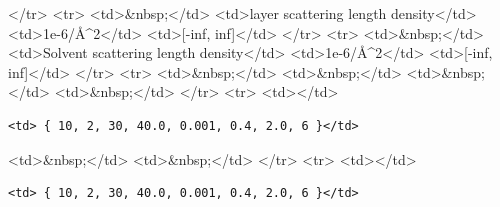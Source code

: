 \textless{}/tr\textgreater{} \textless{}tr\textgreater{} \textless{}td\textgreater{}\&nbsp;\textless{}/td\textgreater{} \textless{}td\textgreater{}layer scattering length density\textless{}/td\textgreater{} \textless{}td\textgreater{}1e-6/\AA{}\textasciicircum{}2\textless{}/td\textgreater{} \textless{}td\textgreater{}[-inf, inf]\textless{}/td\textgreater{} \textless{}/tr\textgreater{} \textless{}tr\textgreater{} \textless{}td\textgreater{}\&nbsp;\textless{}/td\textgreater{} \textless{}td\textgreater{}Solvent scattering length density\textless{}/td\textgreater{} \textless{}td\textgreater{}1e-6/\AA{}\textasciicircum{}2\textless{}/td\textgreater{} \textless{}td\textgreater{}[-inf, inf]\textless{}/td\textgreater{} \textless{}/tr\textgreater{} \textless{}tr\textgreater{} \textless{}td\textgreater{}\&nbsp;\textless{}/td\textgreater{} \textless{}td\textgreater{}\&nbsp;\textless{}/td\textgreater{} \textless{}td\textgreater{}\&nbsp;\textless{}/td\textgreater{} \textless{}td\textgreater{}\&nbsp;\textless{}/td\textgreater{} \textless{}/tr\textgreater{} \textless{}tr\textgreater{} \textless{}td\textgreater{}\textless{}/td\textgreater{}

\begin{verbatim}
<td> { 10, 2, 30, 40.0, 0.001, 0.4, 2.0, 6 }</td>
\end{verbatim}

\textless{}td\textgreater{}\&nbsp;\textless{}/td\textgreater{} \textless{}td\textgreater{}\&nbsp;\textless{}/td\textgreater{} \textless{}/tr\textgreater{} \textless{}tr\textgreater{} \textless{}td\textgreater{}\textless{}/td\textgreater{}

\begin{verbatim}
<td> { 10, 2, 30, 40.0, 0.001, 0.4, 2.0, 6 }</td>
\end{verbatim}

